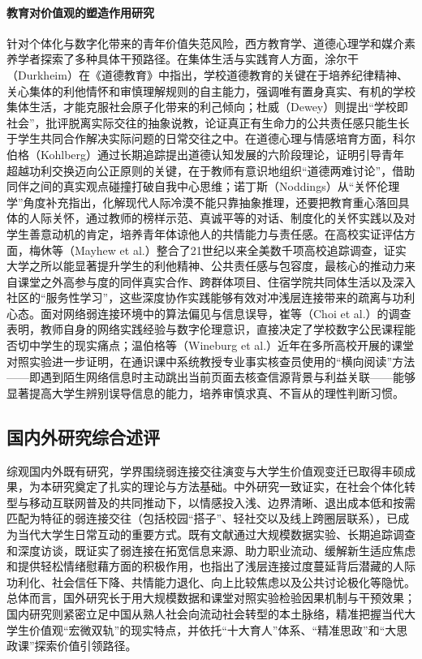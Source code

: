 \paragraph{教育对价值观的塑造作用研究}
针对个体化与数字化带来的青年价值失范风险，西方教育学、道德心理学和媒介素养学者探索了多种具体干预路径。在集体生活与实践育人方面，涂尔干（Durkheim）在《道德教育》中指出，学校道德教育的关键在于培养纪律精神、关心集体的利他情怀和审慎理解规则的自主能力，强调唯有置身真实、有机的学校集体生活，才能克服社会原子化带来的利己倾向\cite{Durkheim2001}；杜威（Dewey）则提出“学校即社会”，批评脱离实际交往的抽象说教，论证真正有生命力的公共责任感只能生长于学生共同合作解决实际问题的日常交往之中\cite{Dewey2013}。在道德心理与情感培育方面，科尔伯格（Kohlberg）通过长期追踪提出道德认知发展的六阶段理论，证明引导青年超越功利交换迈向公正原则的关键，在于教师有意识地组织“道德两难讨论”，借助同伴之间的真实观点碰撞打破自我中心思维\cite{Kohlberg1981}；诺丁斯（Noddings）从“关怀伦理学”角度补充指出，化解现代人际冷漠不能只靠抽象推理，还要把教育重心落回具体的人际关怀，通过教师的榜样示范、真诚平等的对话、制度化的关怀实践以及对学生善意动机的肯定，培养青年体谅他人的共情能力与责任感\cite{Noddings2013}。在高校实证评估方面，梅休等（Mayhew et al.）整合了21世纪以来全美数千项高校追踪调查，证实大学之所以能显著提升学生的利他精神、公共责任感与包容度，最核心的推动力来自课堂之外高参与度的同伴真实合作、跨群体项目、住宿学院共同体生活以及深入社区的“服务性学习”，这些深度协作实践能够有效对冲浅层连接带来的疏离与功利心态\cite{Mayhew2016}。面对网络弱连接环境中的算法偏见与信息误导，崔等（Choi et al.）的调查表明，教师自身的网络实践经验与数字伦理意识，直接决定了学校数字公民课程能否切中学生的现实痛点\cite{Choi2018}；温伯格等（Wineburg et al.）近年在多所高校开展的课堂对照实验进一步证明，在通识课中系统教授专业事实核查员使用的“横向阅读”方法——即遇到陌生网络信息时主动跳出当前页面去核查信源背景与利益关联——能够显著提高大学生辨别误导信息的能力，培养审慎求真、不盲从的理性判断习惯\cite{Wineburg2022}。

\subsection{国内外研究综合述评}
\label{sec:research-review}

综观国内外既有研究，学界围绕弱连接交往演变与大学生价值观变迁已取得丰硕成果，为本研究奠定了扎实的理论与方法基础。中外研究一致证实，在社会个体化转型与移动互联网普及的共同推动下，以情感投入浅、边界清晰、退出成本低和按需匹配为特征的弱连接交往（包括校园“搭子”、轻社交以及线上跨圈层联系），已成为当代大学生日常互动的重要方式。既有文献通过大规模数据实验、长期追踪调查和深度访谈，既证实了弱连接在拓宽信息来源、助力职业流动、缓解新生适应焦虑和提供轻松情绪慰藉方面的积极作用，也指出了浅层连接过度蔓延背后潜藏的人际功利化、社会信任下降、共情能力退化、向上比较焦虑以及公共讨论极化等隐忧。总体而言，国外研究长于用大规模数据和课堂对照实验检验因果机制与干预效果；国内研究则紧密立足中国从熟人社会向流动社会转型的本土脉络，精准把握当代大学生价值观“宏微双轨”的现实特点，并依托“十大育人”体系、“精准思政”和“大思政课”探索价值引领路径。

